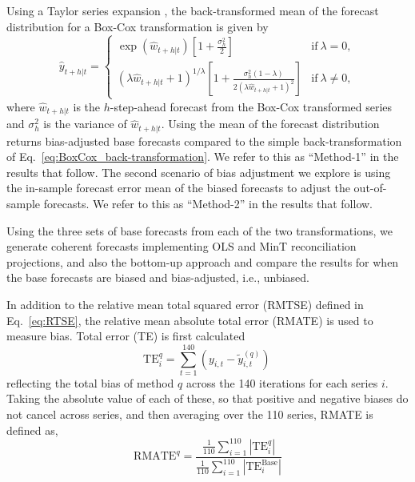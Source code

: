 \documentclass[12pt]{article}
\theoremstyle{definition}
\begin{document}
{Using a Taylor series expansion \citep{guerrero1993time}, the back-transformed mean of the forecast distribution for a Box-Cox transformation is given by
\begin{equation}\label{eq:BoxCox_BT_biasadj}
  \hat{y}_{t+h|t} =
    \begin{cases}
      \exp(\hat{w}_{t+h|t})\left[1+\frac{\sigma_h^2}{2}\right] & \text{if}~\lambda = 0, \\
      (\lambda \hat{w}_{t+h|t} + 1)^{1/\lambda}
        \left[1 + \frac{\sigma_h^2(1-\lambda)}{2(\lambda \hat{w}_{t+h|t} + 1)^2}\right]
                                                      & \text{if}~\lambda \ne 0,
\end{cases}
\end{equation}
where $\hat{w}_{t+h|t}$ is the $h$-step-ahead forecast from the Box-Cox transformed series and $\sigma_h^2$ is the variance of $\hat{w}_{t+h|t}$. Using the mean of the forecast distribution returns bias-adjusted base forecasts compared to the simple back-transformation of Eq.~\eqref{eq:BoxCox_back-transformation}. We refer to this as ``Method-1'' in the results that follow. The second scenario of bias adjustment we explore is using the in-sample forecast error mean of the biased forecasts to adjust the out-of-sample forecasts. We refer to this as ``Method-2'' in the results that follow.

Using the three sets of base forecasts from each of the two transformations, we generate coherent forecasts implementing OLS and MinT reconciliation projections, and also the bottom-up approach and compare the results for when the base forecasts are biased and bias-adjusted, i.e., unbiased. {\color{blue} In addition to the relative mean total squared error (RMTSE) defined in Eq.~\eqref{eq:RTSE}, the relative mean absolute total error (RMATE) is used to measure bias. Total error (TE) is first calculated
\begin{equation*}
\textrm{TE}^{q}_i=\sum\limits_{t=1}^{140}(y_{i,t}-\tilde{y}^{(q)}_{i,t})\,
\end{equation*}
reflecting the total bias of method $q$ across the 140 iterations for each series $i$. Taking the absolute value of each of these, so that positive and negative biases do not cancel across series, and then averaging over the 110 series, RMATE is defined as,
\begin{equation*}
\textrm{RMATE}^{q}=\frac{\frac{1}{110}\sum\limits_{i=1}^{110}|\textrm{TE}^{q}_i|}{\frac{1}{110}\sum\limits_{i=1}^{110}|\textrm{TE}^{\textrm{Base}}_i|} \end{equation*}

}}
\end{document}
